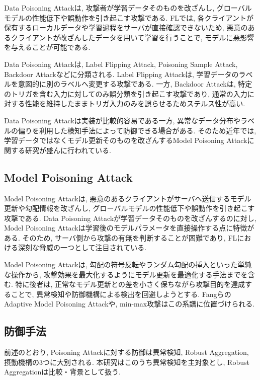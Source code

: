 \documentclass[a4j, twocolumn, dvipdfmx]{jsarticle}
\begin{document}
Data Poisoning Attackは, 攻撃者が学習データそのものを改ざんし, グローバルモデルの性能低下や誤動作を引き起こす攻撃である. FLでは, 各クライアントが保有するローカルデータや学習過程をサーバが直接確認できないため, 悪意のあるクライアントが改ざんしたデータを用いて学習を行うことで, モデルに悪影響を与えることが可能である\cite{sagar2023survey}.

Data Poisoning Attackは, Label Flipping Attack, Poisoning Sample Attack, Backdoor Attackなどに分類される. Label Flipping Attackは, 学習データのラベルを意図的に別のラベルへ変更する攻撃である. 一方, Backdoor Attackは, 特定のトリガを含む入力に対してのみ誤分類を引き起こす攻撃であり, 通常の入力に対する性能を維持したままトリガ入力のみを誤らせるためステルス性が高い.

Data Poisoning Attackは実装が比較的容易である一方, 異常なデータ分布やラベルの偏りを利用した検知手法によって防御できる場合がある. そのため近年では, 学習データではなくモデル更新そのものを改ざんするModel Poisoning Attackに関する研究が盛んに行われている\cite{sagar2023survey,xie2020dba,nguyen2022flame}.

\subsection{Model Poisoning Attack}

Model Poisoning Attackは, 悪意のあるクライアントがサーバへ送信するモデル更新や勾配情報を改ざんし, グローバルモデルの性能低下や誤動作を引き起こす攻撃である. Data Poisoning Attackが学習データそのものを改ざんするのに対し, Model Poisoning Attackは学習後のモデルパラメータを直接操作する点に特徴がある. そのため, サーバ側から攻撃の有無を判断することが困難であり, FLにおける深刻な脅威の一つとして注目されている\cite{sagar2023survey}.

Model Poisoning Attackは, 勾配の符号反転やランダム勾配の挿入といった単純な操作から, 攻撃効果を最大化するようにモデル更新を最適化する手法までを含む. 特に後者は, 正常なモデル更新との差を小さく保ちながら攻撃目的を達成することで, 異常検知や防御機構による検出を回避しようとする\cite{bagdasaryan2020model}. Fangら\cite{fang2020local}のAdaptive Model Poisoning Attackや, min-max攻撃\cite{shejwalkar2021manipulating}はこの系譜に位置づけられる.

\subsection{防御手法}

前述のとおり, Poisoning Attackに対する防御は異常検知, Robust Aggregation, 摂動機構の3つに大別される\cite{sagar2023survey}. 本研究はこのうち異常検知を主対象とし, Robust Aggregationは比較・背景として扱う.
\end{document}
